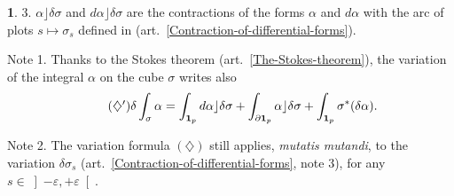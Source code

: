 \documentclass[11pt,reqno]{amsart}
\theoremstyle{definition}
\newtheorem{article}{}
\newcommand{\art}[1]{{(art.~\ref{#1})}}
\newcommand{\xart}[2]{{(art.~\ref{#1}, #2)}}
\newcommand{\openinterval}[1]{\left] #1 \right[}
\newcommand{\id}{{\bf 1}}
\begin{document}
\begin{article}
      3. $\alpha \rfloor \delta\sigma$ and
      $d\alpha \rfloor \delta\sigma$  are the contractions of
      the forms $\alpha$ and $d\alpha$ with the arc of plots $s
        \mapsto \sigma_s$
      defined in \art{Contraction-of-differential-forms}.

    {\sc Note 1.} Thanks to the Stokes theorem
    \art{The-Stokes-theorem}, the variation of the integral
    $\alpha$ on the cube $\sigma$ writes also
    \begin{equation} \tag{$\diamondsuit'$}
      \delta \int_\sigma \alpha
      = \int_{\id_p} d\alpha \rfloor \delta\sigma +
      \int_{\partial \id_p} \alpha \rfloor \delta\sigma +
      \int_{\id_p} \sigma^*(\delta \alpha).
      \end{equation}
    
    {\sc Note 2.} The variation formula $(\diamondsuit)$ still
    applies, {\em mutatis mutandi}, to the variation
    $\delta\sigma_s$
    \xart{Contraction-of-differential-forms}{note 3}, for any
    $s \in \openinterval{-\varepsilon,+\varepsilon}$.
  \end{article} %
  
\end{document}
